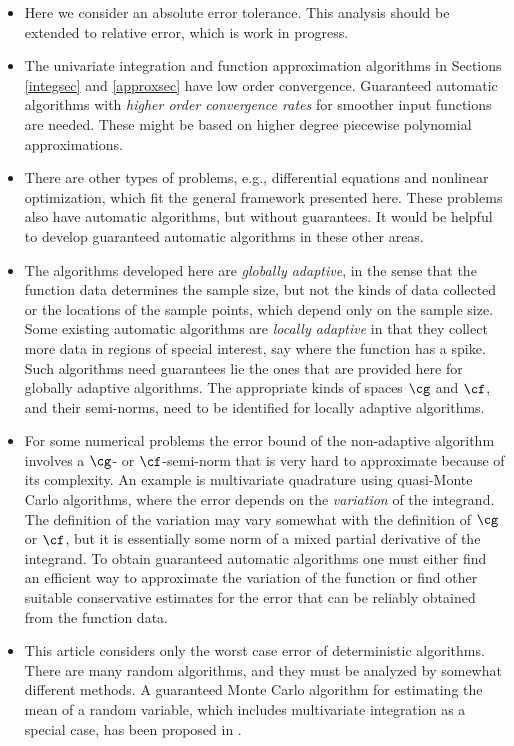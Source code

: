 \documentclass[]{elsarticle}
\theoremstyle{definition}
\theoremstyle{remark}
\begin{document}
\begin{itemize}

\item Here we consider an absolute error tolerance.  This analysis should be extended to relative error, which is work in progress.  

\item The univariate integration and function approximation algorithms in Sections \ref{integsec} and \ref{approxsec} have low order convergence.  Guaranteed automatic algorithms with \emph{higher order convergence rates} for smoother input functions are needed.  These might be based on higher degree piecewise polynomial approximations.

\item There are other types of problems, e.g., differential equations and nonlinear optimization, which fit the general framework presented here.  These problems also have automatic algorithms, but without guarantees.  It would be helpful to develop guaranteed automatic algorithms in these other areas.

\item The algorithms developed here are \emph{globally adaptive}, in the sense that the function data determines the sample size, but not the kinds of data collected or the locations of the sample points, which depend only on the sample size.  Some existing automatic algorithms are \emph{locally adaptive} in that they collect more data in regions of special interest, say where the function has a spike.  Such algorithms need guarantees lie the ones that are provided here for globally adaptive algorithms.  The appropriate kinds of spaces $\cg$ and $\cf$, and their semi-norms, need to be identified for locally adaptive algorithms.

\item For some numerical problems the error bound of the non-adaptive algorithm involves a $\cg$- or $\cf$-semi-norm that is very hard to approximate because of its complexity.  An example is multivariate quadrature using quasi-Monte Carlo algorithms, where the error depends on the \emph{variation} of the integrand.  The definition of the variation may vary somewhat with the definition of $\cg$ or $\cf$, but it is essentially some norm of a mixed partial derivative of the integrand.  To obtain guaranteed automatic algorithms one must either find an efficient way to approximate the variation of the function or find other suitable conservative estimates for the error that can be reliably obtained from the function data.  

\item This article considers only the worst case error of deterministic algorithms.  There are many random algorithms, and they must be analyzed by somewhat different methods.  A guaranteed Monte Carlo algorithm for estimating the mean of a random variable, which includes multivariate integration as a special case, has been proposed in \cite{HicEtal14a}.

\end{itemize}
\end{document}
